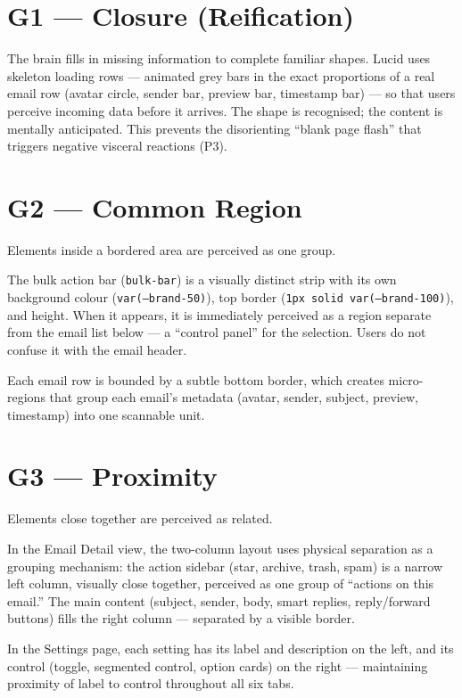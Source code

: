 \documentclass[12pt,a4paper]{report}
\begin{document}
\section{G1 — Closure (Reification)}

The brain fills in missing information to complete familiar shapes. Lucid uses skeleton
loading rows — animated grey bars in the exact proportions of a real email row (avatar circle,
sender bar, preview bar, timestamp bar) — so that users perceive incoming data before it
arrives. The shape is recognised; the content is mentally anticipated. This prevents the
disorienting ``blank page flash'' that triggers negative visceral reactions (P3).

\section{G2 — Common Region}

Elements inside a bordered area are perceived as one group.

The bulk action bar (\texttt{bulk-bar}) is a visually distinct strip with its own background
colour (\texttt{var(--brand-50)}), top border (\texttt{1px solid var(--brand-100)}), and
height. When it appears, it is immediately perceived as a region separate from the email list
below — a ``control panel'' for the selection. Users do not confuse it with the email header.

Each email row is bounded by a subtle bottom border, which creates micro-regions that group
each email's metadata (avatar, sender, subject, preview, timestamp) into one scannable unit.

\section{G3 — Proximity}

Elements close together are perceived as related.

In the Email Detail view, the two-column layout uses physical separation as a grouping
mechanism: the action sidebar (star, archive, trash, spam) is a narrow left column, visually
close together, perceived as one group of ``actions on this email.'' The main content
(subject, sender, body, smart replies, reply/forward buttons) fills the right column —
separated by a visible border.

In the Settings page, each setting has its label and description on the left, and its
control (toggle, segmented control, option cards) on the right — maintaining proximity of
label to control throughout all six tabs.
\end{document}
